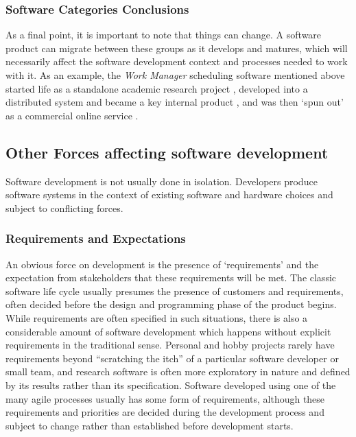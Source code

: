 \subsubsection{Software Categories Conclusions}

As a final point, it is important to note that things can change. A software product can migrate between these groups as it develops and matures, which will necessarily affect the software development context and processes needed to work with it. As an example, the \emph{Work Manager} scheduling software mentioned above started life as a standalone academic research project \citep{Lesaint2003}, developed into a distributed system and became a key internal product \citep{Garwood1997}, and was then `spun out' as a commercial online service \citep{Trimble2006}.

\subsection{Other Forces affecting software development}

Software development is not usually done in isolation. Developers produce software systems in the context of existing software and hardware choices and subject to conflicting forces.

\subsubsection{Requirements and Expectations}

An obvious force on development is the presence of `requirements' and the expectation from stakeholders that these requirements will be met. The classic software life cycle usually presumes the presence of customers and requirements, often decided before the design and programming phase of the product begins. While requirements are often specified in such situations, there is also a considerable amount of software development which happens without explicit requirements in the traditional sense. Personal and hobby projects rarely have requirements beyond \enquote{scratching the itch} \citep{Raymond2010} of a particular software developer or small team, and research software is often more exploratory in nature and defined by its results rather than its specification. Software developed using one of the many agile processes \citep{Hoda2017} usually has some form of requirements, although these requirements and priorities are decided during the development process and subject to change rather than established before development starts.

